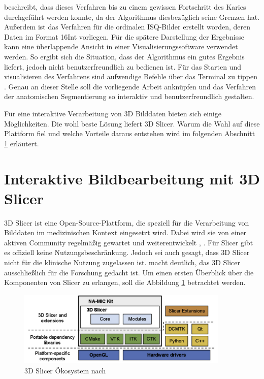 \citet[S.~55]{hoffmann2020} beschreibt, dass dieses Verfahren bis zu einem gewissen
Fortschritt des Karies durchgeführt werden konnte, da der Algorithmus
diesbezüglich seine Grenzen hat. Außerdem ist das Verfahren für die ordinalen \ac{ISQ}-Bilder
erstellt worden, deren Daten im Format \ac{16Int} vorliegen. Für die spätere Darstellung
der Ergebnisse kann eine überlappende Ansicht in einer Visualisierungssoftware verwendet
werden. So ergibt sich die Situation, dass der Algorithmus ein gutes Ergebnis liefert,
jedoch nicht benutzerfreundlich zu bedienen ist. Für das Starten und visualisieren
des Verfahrens sind aufwendige Befehle über das Terminal zu tippen \citep[vgl.][S.~53]{hoffmann2020}.
Genau an dieser Stelle soll die vorliegende Arbeit anknüpfen und das Verfahren der
anatomischen Segmentierung so interaktiv und benutzerfreundlich gestalten.

Für eine interaktive Verarbeitung von 3D Bilddaten bieten sich einige Möglichkeiten.
Die wohl beste Lösung liefert 3D Slicer. Warum die Wahl auf diese Plattform fiel
und welche Vorteile daraus entstehen wird im folgenden Abschnitt \ref{sec:3d_slicer}
erläutert.

\section{Interaktive Bildbearbeitung mit 3D Slicer}
\label{sec:3d_slicer} 3D Slicer ist eine Open-Source-Plattform, die speziell für
die Verarbeitung von Bilddaten im medizinischen Kontext eingesetzt wird. Dabei wird
sie von einer aktiven Community regelmäßig gewartet und weiterentwickelt \citep[vgl.][]{slicer2024},
\citep[vgl.][S.~3]{fedorov2012slicer}. Für Slicer gibt es offiziell keine Nutzungsbeschränkung.
Jedoch sei auch gesagt, dass 3D Slicer nicht für die klinische Nutzung zugelassen
ist. \citet[S.~7]{fedorov2012slicer} macht deutlich, das 3D Slicer
ausschließlich für die Forschung gedacht ist. Um einen ersten Überblick über die
Komponenten von Slicer zu erlangen, soll die Abbildung
\ref{fig:3d_slicer_oekosystem} betrachtet werden.

\begin{figure}[h]
	\centering
	\includegraphics[width=0.9\textwidth]{img/3d_slicer_overview.jpg}
	\caption{3D Slicer Ökosystem nach \citet[S.~23]{fedorov2012slicer}}
	\label{fig:3d_slicer_oekosystem}
\end{figure}


